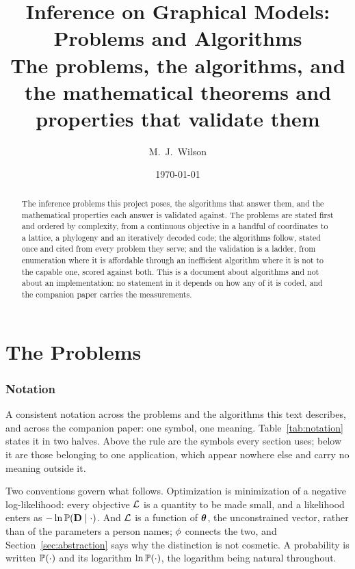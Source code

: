\documentclass[11pt,a4paper]{article}
\title{Inference on Graphical Models: Problems and Algorithms \\
\large The problems, the algorithms, and the mathematical theorems and
properties that validate them}
\author{M.\ J.\ Wilson}
\date{\today}
\begin{document}
\maketitle

\begin{abstract}
\noindent
The inference problems this project poses, the algorithms that answer them,
and the mathematical properties each answer is validated against. The problems
are stated first and ordered by complexity, from a continuous objective in a
handful of coordinates to a lattice, a phylogeny and an iteratively decoded
code; the algorithms follow, stated once and cited from every problem they
serve; and the validation is a ladder, from enumeration where it is affordable
through an inefficient algorithm where it is not to the capable one, scored
against both. This is a document about algorithms and not about an
implementation: no statement in it depends on how any of it is coded, and the
companion paper carries the measurements.
\end{abstract}

\tableofcontents

\part{The Problems}

\section{Notation}
\label{sec:notation}

A consistent notation across the problems and the algorithms this text
describes, and across the companion paper: one symbol, one meaning.
Table~\ref{tab:notation} states it in two halves. Above the rule are the
symbols every section uses; below it are those belonging to one application,
which appear nowhere else and carry no meaning outside it.

Two conventions govern what follows. Optimization is minimization of a
negative log-likelihood: every objective $\mathcal{L}$ is a quantity to be
made small, and a likelihood enters as $-\ln \mathbb{P}(\mathbf{D} \mid \cdot)$.
And $\mathcal{L}$ is a function of $\boldsymbol{\theta}$, the unconstrained vector, rather
than of the parameters a person names; $\phi$ connects the two, and
Section~\ref{sec:abstraction} says why the distinction is not cosmetic. A
probability is written $\mathbb{P}(\cdot)$ and its logarithm $\ln \mathbb{P}(\cdot)$,
the logarithm being natural throughout.
\end{document}
